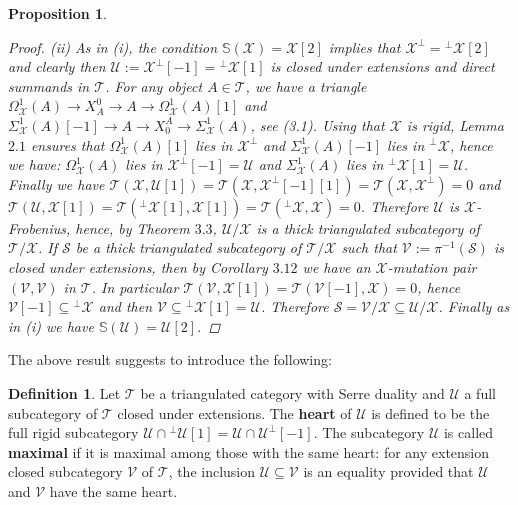 \documentclass[oneside, a4paper,reqno]{amsart}
\numberwithin{equation}{section}
\newtheorem{prop}[thm]{Proposition}
\theoremstyle{definition}
\newtheorem{defn}[thm]{Definition}
\begin{document}
\begin{prop}
\begin{proof}
(ii) As in (i), the condition $\mathbb S({\mathcal X}) = {\mathcal X}[2]$ implies that ${\mathcal X}^{\bot} = {^{\bot}}{\mathcal X}[2]$ and clearly then  ${\mathcal U} := {\mathcal X}^{\bot}[-1] = {^{\bot}}{\mathcal X}[1]$ is closed under extensions and direct summands in ${\mathcal T}$. For any object $A \in {\mathcal T}$, we have a triangle $\Omega^{1}_{\mathcal X}(A) {\longrightarrow} X^{0}_{A} {\longrightarrow} A {\longrightarrow} \Omega^{1}_{\mathcal X}(A)[1]$ and $\Sigma^{1}_{\mathcal X}(A)[-1] {\longrightarrow} A {\longrightarrow} X^{A}_{0} {\longrightarrow} \Sigma^{1}_{\mathcal X}(A)$, see (3.1). Using that ${\mathcal X}$ is rigid,  Lemma $2.1$ ensures that  
$\Omega^{1}_{\mathcal X}(A)[1]$ lies in ${\mathcal X}^{\bot}$ and $\Sigma^{1}_{\mathcal X}(A)[-1]$ lies in ${^{\bot}}{\mathcal X}$, hence we have:  $\Omega^{1}_{\mathcal X}(A)$ lies in ${\mathcal X}^{\bot}[-1] = {\mathcal U}$ and $\Sigma^{1}_{\mathcal X}(A)$ lies in ${^{\bot}}{\mathcal X}[1] = {\mathcal U}$. Finally we have ${\mathcal T}({\mathcal X},{\mathcal U}[1]) =
 {\mathcal T}({\mathcal X},{\mathcal X}^{\bot}[-1][1]) = {\mathcal T}({\mathcal X},{\mathcal X}^{\bot}) = 0$ and  ${\mathcal T}({\mathcal U},{\mathcal X}[1]) = {\mathcal T}({^{\bot}}{\mathcal X}[1],{\mathcal X}[1]) ={\mathcal T}({^{\bot}}{\mathcal X},{\mathcal X}) = 0$. Therefore ${\mathcal U}$ is ${\mathcal X}$-Frobenius, hence, by Theorem $3.3$, ${\mathcal U}/{\mathcal X}$ is a thick triangulated subcategory of ${\mathcal T}/{\mathcal X}$.   If $\mathcal S$ be a thick triangulated subcategory of ${\mathcal T}/{\mathcal X}$ such that ${\mathcal V} := \pi^{-1}(\mathcal S)$ is closed under extensions, then by Corollary $3.12$ we have an ${\mathcal X}$-mutation pair  $({\mathcal V},{\mathcal V})$ in ${\mathcal T}$. In particular ${\mathcal T}({\mathcal V},{\mathcal X}[1]) = {\mathcal T}({\mathcal V}[-1],{\mathcal X}) = 0$, hence ${\mathcal V}[-1] \subseteq {^{\bot}}{\mathcal X}$ and then ${\mathcal V} \subseteq {^{\bot}}{\mathcal X}[1] = {\mathcal U}$. Therefore $\mathcal S  = {\mathcal V}/{\mathcal X} \subseteq {\mathcal U}/{\mathcal X}$. Finally as in (i) we have $\mathbb S({\mathcal U}) = {\mathcal U}[2]$. 
\end{proof}
\end{prop}   

The above result suggests to introduce the following:

\begin{defn} Let ${\mathcal T}$ be a triangulated category with Serre duality and ${\mathcal U}$ a full subcategory of ${\mathcal T}$ closed under extensions.  The {\bf heart} of ${\mathcal U}$ is defined to be the full rigid subcategory ${\mathcal U} \cap {^{\bot}}{\mathcal U}[1] = {\mathcal U} \cap {\mathcal U}^{\bot}[-1]$. The subcategory ${\mathcal U}$ is called {\bf maximal} if it is maximal among those with the same heart: for any extension closed subcategory ${\mathcal V}$ of ${\mathcal T}$, the inclusion ${\mathcal U}\subseteq {\mathcal V}$ is an equality provided that ${\mathcal U}$ and ${\mathcal V}$ have the same heart. \end{defn}
\end{document}
